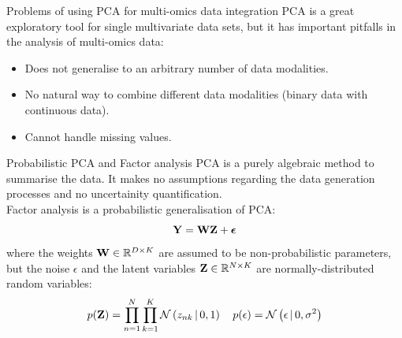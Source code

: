 \documentclass[aspectratio=169,notes]{beamer}
\begin{document}



	\begin{frame}{Problems of using PCA for multi-omics data integration}
	PCA is a great exploratory tool for single multivariate data sets, but it has important pitfalls in the analysis of multi-omics data:
	\begin{itemize}
		\item Does not generalise to an arbitrary number of data modalities.
		\item No natural way to combine different data modalities (binary data with continuous data).
		\item Cannot handle missing values.
	\end{itemize}
	\end{frame}

	\begin{frame}{Probabilistic PCA and Factor analysis}
	PCA is a purely algebraic method to summarise the data. It makes no assumptions regarding the data generation processes and no uncertainity quantification.\\
	Factor analysis is a probabilistic generalisation of PCA:
	\[
		{\bf Y} = {\bf W} {\bf Z} + \mbox{\boldmath $\epsilon$}
	\]
	where the weights ${\bf W} \in \mathbb{R}^{D \times K}$ are assumed to be non-probabilistic parameters, but the noise $\epsilon$ and the latent variables ${\bf Z} \in \mathbb{R}^{N \times K}$ are normally-distributed random variables:
	\begin{align*}
		p({\bf Z}) = \prod_{n=1}^{N} \prod_{k=1}^{K} \mathcal{N}\left(z_{nk} \,|\, 0,1\right) \quad  
		p(\epsilon) = \mathcal{N}\left(\epsilon \,|\, 0,\sigma^{2}\right)
	\end{align*}
	\end{frame}
\end{document}

